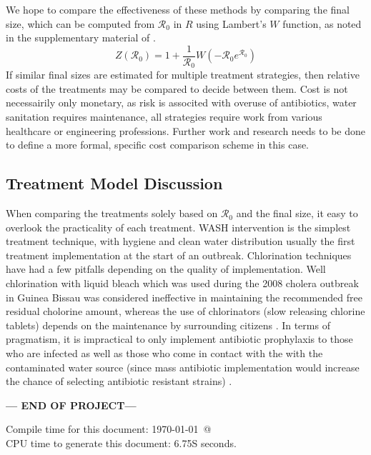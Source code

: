 \documentclass[12pt]{article}\usepackage[]{graphicx}\usepackage[]{color}
\begin{document}
We hope to compare the effectiveness of these methods by comparing the final size, which can be computed from ${\mathcal R_0}$ in $R$ using Lambert's $W$ function, as noted in the supplementary material of \cite{link20}.
\begin{equation}
    Z({\mathcal R_0}) = 1+\frac{1}{{\mathcal R_0}}W(-{\mathcal R_0}e^{{\mathcal R_0}})
\end{equation}
If similar final sizes are estimated for multiple treatment strategies, then relative costs of the treatments may be compared to decide between them.
Cost is not necessairily only monetary, as risk is associted with overuse of antibiotics, water sanitation requires maintenance, all strategies require work from various healthcare or engineering professions.
Further work and research needs to be done to define a more formal, specific cost comparison scheme in this case.

\subsection{Treatment Model Discussion}
When comparing the treatments solely based on $\mathcal R_0$ and the final size, it easy to overlook the practicality of each treatment. WASH intervention is the simplest treatment technique, with hygiene and clean water distribution usually the first treatment implementation at the start of an outbreak.
Chlorination techniques have had a few pitfalls depending on the quality of implementation.
Well chlorination with liquid bleach which was used during the 2008 cholera outbreak in Guinea Bissau was considered ineffective in maintaining the recommended free residual cholorine amount, whereas the use of chlorinators (slow releasing chlorine tablets) depends on the maintenance by surrounding citizens \citep{link27}.
In terms of pragmatism, it is impractical to only implement antibiotic prophylaxis to those who are infected as well as those who come in contact with the with the contaminated water source (since mass antibiotic implementation would increase the chance of selecting antibiotic resistant strains) \citep{link23}.

\bigskip\vfill
\centerline{\bf--- END OF PROJECT---}
\bigskip
Compile time for this document:
\today\ @ \thistime\\
CPU time to generate this document: 6.75S seconds.
\printbibliography
\end{document}
